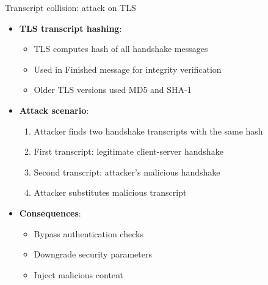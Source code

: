 \ifdefined\PRESENTATION\else\PassOptionsToClass{handout}{beamer}\fi\documentclass[aspectratio=169, lualatex]{beamer}
\begin{document}
\begin{frame}{Transcript collision: attack on TLS}
	\begin{itemize}
		\item \textbf{TLS transcript hashing}:
		      \begin{itemize}
			      \item TLS computes hash of all handshake messages
			      \item Used in Finished message for integrity verification
			      \item Older TLS versions used MD5 and SHA-1
		      \end{itemize}
		\item \textbf{Attack scenario}:
		      \begin{enumerate}
			      \item Attacker finds two handshake transcripts with the same hash
			      \item First transcript: legitimate client-server handshake
			      \item Second transcript: attacker's malicious handshake
			      \item Attacker substitutes malicious transcript
		      \end{enumerate}
		\item \textbf{Consequences}:
		      \begin{itemize}
			      \item Bypass authentication checks
			      \item Downgrade security parameters
			      \item Inject malicious content
		      \end{itemize}
	\end{itemize}
\end{frame}
\end{document}
